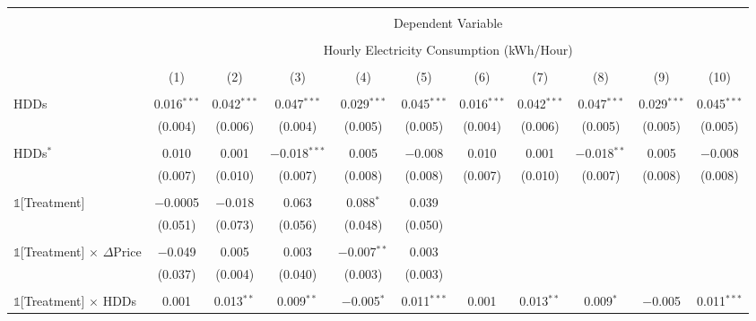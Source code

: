 
\begin{table}[!htbp] \centering 
  \label{Table:Breakdown-of-Average-Treatement-Effects_As-a-Function-of-Rate-Changes_Using-Different-Rate-Changes_For-Different-Intervals} 
\scriptsize 
\begin{longtable}{@{\extracolsep{0pt}}lcccccccccc} 
\\[-1.8ex]\hline 
\hline \\[-1.8ex] 
 & \multicolumn{10}{c}{Dependent Variable} \\ 
\cline{2-11} 
\\[-1.8ex] & \multicolumn{10}{c}{Hourly Electricity Consumption  (kWh/Hour)} \\ 
\\[-1.8ex] & (1) & (2) & (3) & (4) & (5) & (6) & (7) & (8) & (9) & (10)\\ 
\hline \\[-1.8ex] \endhead
 HDDs & 0.016$^{***}$ & 0.042$^{***}$ & 0.047$^{***}$ & 0.029$^{***}$ & 0.045$^{***}$ & 0.016$^{***}$ & 0.042$^{***}$ & 0.047$^{***}$ & 0.029$^{***}$ & 0.045$^{***}$ \\ 
  & (0.004) & (0.006) & (0.004) & (0.005) & (0.005) & (0.004) & (0.006) & (0.005) & (0.005) & (0.005) \\ 
  & & & & & & & & & & \\ 
 HDDs$^{*}$ & 0.010 & 0.001 & $-$0.018$^{***}$ & 0.005 & $-$0.008 & 0.010 & 0.001 & $-$0.018$^{**}$ & 0.005 & $-$0.008 \\ 
  & (0.007) & (0.010) & (0.007) & (0.008) & (0.008) & (0.007) & (0.010) & (0.007) & (0.008) & (0.008) \\ 
  & & & & & & & & & & \\ 
 $\mathbb{1}$[Treatment] & $-$0.0005 & $-$0.018 & 0.063 & 0.088$^{*}$ & 0.039 &  &  &  &  &  \\ 
  & (0.051) & (0.073) & (0.056) & (0.048) & (0.050) &  &  &  &  &  \\ 
  & & & & & & & & & & \\ 
 $\mathbb{1}$[Treatment] $\times$ $\Delta$Price & $-$0.049 & 0.005 & 0.003 & $-$0.007$^{**}$ & 0.003 &  &  &  &  &  \\ 
  & (0.037) & (0.004) & (0.040) & (0.003) & (0.003) &  &  &  &  &  \\ 
  & & & & & & & & & & \\ 
 $\mathbb{1}$[Treatment] $\times$ HDDs & 0.001 & 0.013$^{**}$ & 0.009$^{**}$ & $-$0.005$^{*}$ & 0.011$^{***}$ & 0.001 & 0.013$^{**}$ & 0.009$^{*}$ & $-$0.005 & 0.011$^{***}$ \\ 

\end{longtable}
\end{table}
